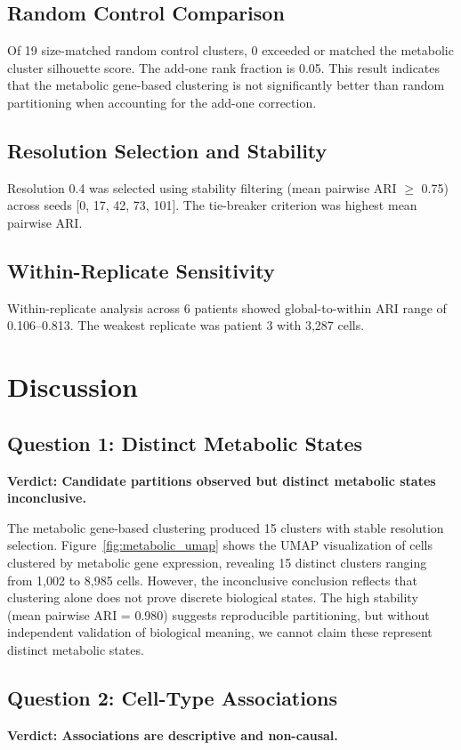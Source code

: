 \documentclass[sloppy,11pt]{article}
\begin{document}
\subsection{Random Control Comparison}
Of 19 size-matched random control clusters, 0 exceeded or matched the metabolic cluster silhouette score. The add-one rank fraction is 0.05. This result indicates that the metabolic gene-based clustering is not significantly better than random partitioning when accounting for the add-one correction.

\subsection{Resolution Selection and Stability}
Resolution 0.4 was selected using stability filtering (mean pairwise ARI $\ge$ 0.75) across seeds [0, 17, 42, 73, 101]. The tie-breaker criterion was highest mean pairwise ARI.

\subsection{Within-Replicate Sensitivity}
Within-replicate analysis across 6 patients showed global-to-within ARI range of 0.106--0.813. The weakest replicate was patient 3 with 3,287 cells.

\section{Discussion}
\subsection{Question 1: Distinct Metabolic States}
\textbf{Verdict: Candidate partitions observed but distinct metabolic states inconclusive.}

The metabolic gene-based clustering produced 15 clusters with stable resolution selection. Figure~\ref{fig:metabolic_umap} shows the UMAP visualization of cells clustered by metabolic gene expression, revealing 15 distinct clusters ranging from 1,002 to 8,985 cells. However, the inconclusive conclusion reflects that clustering alone does not prove discrete biological states. The high stability (mean pairwise ARI = 0.980) suggests reproducible partitioning, but without independent validation of biological meaning, we cannot claim these represent distinct metabolic states.

\subsection{Question 2: Cell-Type Associations}
\textbf{Verdict: Associations are descriptive and non-causal.}
\end{document}
